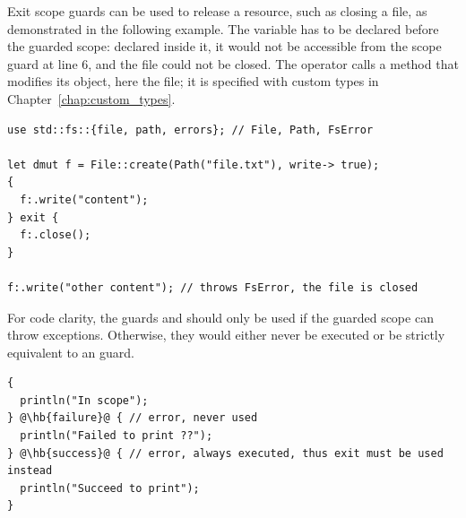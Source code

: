 Exit scope guards can be used to release a resource, such as closing a file, as
demonstrated in the following example. The variable  has to be
declared before the guarded scope: declared inside it, it would not be
accessible from the scope guard at line 6, and the file could not be closed.
The operator  calls a method that modifies its object, here the file;
it is specified with custom types in Chapter~\ref{chap:custom_types}.

\begin{lstlisting}[style=coloredverbatim]
use std::fs::{file, path, errors}; // File, Path, FsError

let dmut f = File::create(Path("file.txt"), write-> true);
{
  f:.write("content");
} exit {
  f:.close();
}

f:.write("other content"); // throws FsError, the file is closed
\end{lstlisting}

For code clarity, the guards  and  should only be
used if the guarded scope can throw exceptions. Otherwise, they would either
never be executed or be strictly equivalent to an  guard.

\begin{lstlisting}[style=coloredverbatimError, escapechar=@]
{
  println("In scope");
} @\hb{failure}@ { // error, never used
  println("Failed to print ??");
} @\hb{success}@ { // error, always executed, thus exit must be used instead
  println("Succeed to print");
}
\end{lstlisting}

\vfill%
\pagebreak
